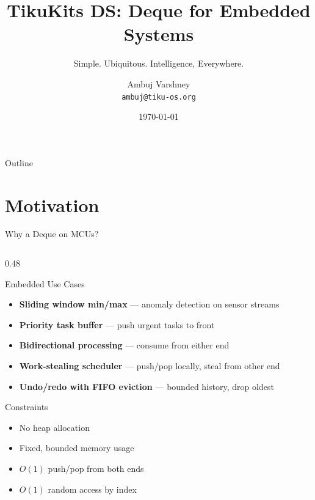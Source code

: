 \documentclass[aspectratio=169, 10pt]{beamer}
\title[TikuKits DS]{TikuKits DS: Deque for Embedded Systems}
\subtitle{Simple. Ubiquitous. Intelligence, Everywhere.}
\author[Ambuj Varshney]{Ambuj Varshney \\ \texttt{ambuj@tiku-os.org}}
\date{\today}
\begin{document}
\begin{frame}
\titlepage
\end{frame}

\begin{frame}{Outline}
\tableofcontents
\end{frame}

\section{Motivation}

\begin{frame}{Why a Deque on MCUs?}
\begin{columns}[T]
\begin{column}{0.48\textwidth}
\begin{block}{Embedded Use Cases}
\begin{itemize}
  \item \textbf{Sliding window min/max} --- anomaly detection on sensor streams
  \item \textbf{Priority task buffer} --- push urgent tasks to front
  \item \textbf{Bidirectional processing} --- consume from either end
  \item \textbf{Work-stealing scheduler} --- push/pop locally, steal from other end
  \item \textbf{Undo/redo with FIFO eviction} --- bounded history, drop oldest
\end{itemize}
\end{block}

\begin{block}{Constraints}
\begin{itemize}
  \item No heap allocation
  \item Fixed, bounded memory usage
  \item $O(1)$ push/pop from both ends
  \item $O(1)$ random access by index
\end{itemize}
\end{block}
\end{column}


\end{columns}
\end{frame}
\end{document}
